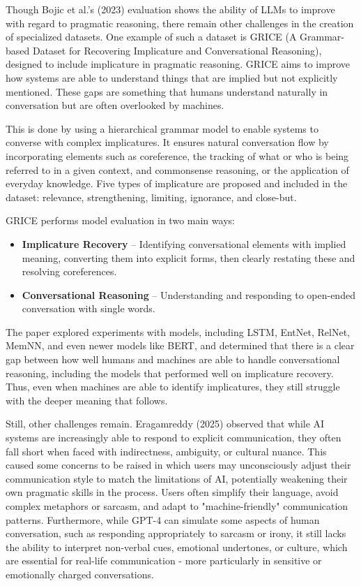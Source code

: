 Though Bojic et al.’s (2023) evaluation shows the ability of LLMs to improve with regard to pragmatic reasoning, there remain other challenges in the creation of specialized datasets. One example of such a dataset is GRICE (A Grammar-based Dataset for Recovering Implicature and Conversational Reasoning), designed to include implicature in pragmatic reasoning. GRICE aims to improve how systems are able to understand things that are implied but not explicitly mentioned. These gaps are something that humans understand naturally in conversation but are often overlooked by machines.

This is done by using a hierarchical grammar model to enable systems to converse with complex implicatures. It ensures natural conversation flow by incorporating elements such as coreference, the tracking of what or who is being referred to in a given context, and commonsense reasoning, or the application of everyday knowledge. Five types of implicature are proposed and included in the dataset: relevance, strengthening, limiting, ignorance, and close-but.

GRICE performs model evaluation in two main ways:

\begin{itemize}
    \item \textbf{Implicature Recovery} – Identifying conversational elements with implied meaning, converting them into explicit forms, then clearly restating these and resolving coreferences.
    \item \textbf{Conversational Reasoning} – Understanding and responding to open-ended conversation with single words.
\end{itemize}

The paper explored experiments with models, including LSTM, EntNet, RelNet, MemNN, and even newer models like BERT, and determined that there is a clear gap between how well humans and machines are able to handle conversational reasoning, including the models that performed well on implicature recovery. Thus, even when machines are able to identify implicatures, they still struggle with the deeper meaning that follows.

Still, other challenges remain. Eragamreddy (2025) observed that while AI systems are increasingly able to respond to explicit communication, they often fall short when faced with indirectness, ambiguity, or cultural nuance. This caused some concerns to be raised in which users may unconsciously adjust their communication style to match the limitations of AI, potentially weakening their own pragmatic skills in the process. Users often simplify their language, avoid complex metaphors or sarcasm, and adapt to "machine-friendly" communication patterns. Furthermore, while GPT-4 can simulate some aspects of human conversation, such as responding appropriately to sarcasm or irony, it still lacks the ability to interpret non-verbal cues, emotional undertones, or culture, which are essential for real-life communication - more particularly in sensitive or emotionally charged conversations.

